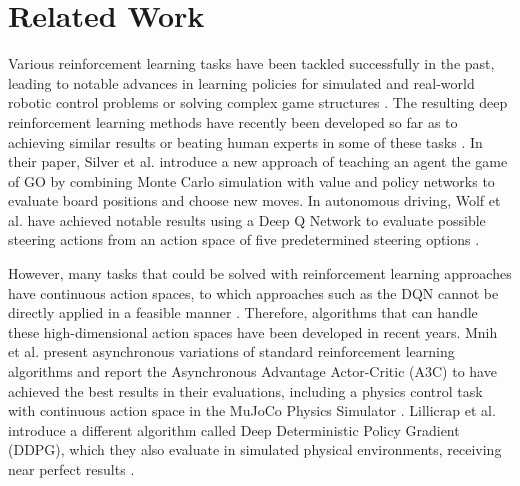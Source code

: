 \documentclass[letterpaper, 10 pt, conference]{ieeeconf}  %
\begin{document}

\section{Related Work}

Various reinforcement learning tasks have been tackled successfully in the past, leading to notable advances in learning policies for simulated and real-world robotic control problems \cite{Levine:2013:GPS:3042817.3042937}\cite{Bruin2015TheIO} or solving complex game structures \cite{Schaul2015PrioritizedER}. The resulting deep reinforcement learning methods have recently been developed so far as to achieving similar results or beating human experts in some of these tasks \cite{44806}\cite{mnih2015humanlevel}. In their paper, Silver et al. introduce a new approach of teaching an agent the game of GO by combining Monte Carlo simulation with value and policy networks to evaluate board positions and choose new moves. In autonomous driving, Wolf et al. have achieved notable results using a Deep Q Network to evaluate possible steering actions from an action space of five predetermined steering options \cite{7995727}. 

However, many tasks that could be solved with reinforcement learning approaches have continuous action spaces, to which approaches such as the DQN cannot be directly applied in a feasible manner \cite{journals/corr/LillicrapHPHETS15}. Therefore, algorithms that can handle these high-dimensional action spaces have been developed in recent years. Mnih et al. present asynchronous variations of standard reinforcement learning algorithms and report the Asynchronous Advantage Actor-Critic (A3C) to have achieved the best results in their evaluations, including a physics control task with continuous action space in the MuJoCo Physics Simulator \cite{mnihAsynchronousMethodsDeep2016}. Lillicrap et al. introduce a different algorithm called Deep Deterministic Policy Gradient (DDPG), which they also evaluate in simulated physical environments, receiving near perfect results \cite{mnih2013playing}.
\end{document}
